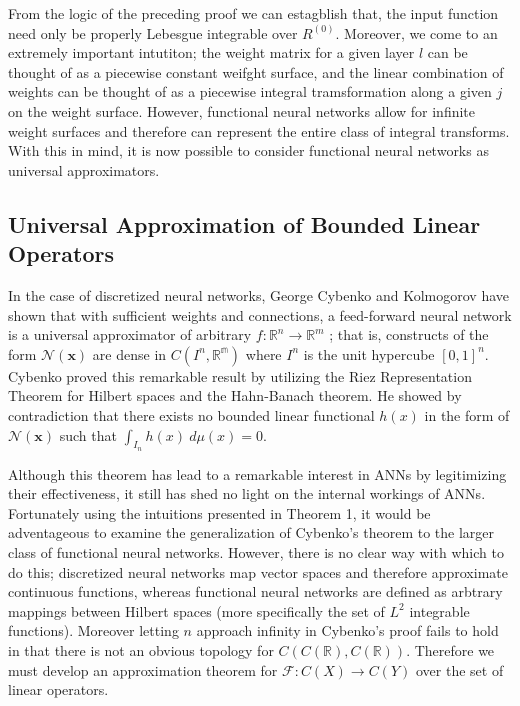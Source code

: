 \documentclass{ib-assignment}
\begin{document}
From the logic of the preceding proof we can estagblish that, the input function need only be properly Lebesgue integrable over $R^{(0)}$. Moreover, we come to an extremely important intutiton; the weight matrix for a given layer $l$ can be thought of as a piecewise constant weifght surface, and the linear combination of weights can be thought of as a piecewise integral tramsformation along a given $j$ on the weight surface. However, functional neural networks allow for infinite weight surfaces and therefore can represent the entire class of integral transforms. With this in mind, it is now possible to consider functional neural networks as universal approximators.
\subsection{Universal Approximation of Bounded Linear Operators}
In the case of discretized neural networks, George Cybenko and Kolmogorov have shown that with sufficient weights and connections, a feed-forward neural network is a universal approximator of arbitrary $f:\mathbb{R}^n \to \mathbb{R}^m$ \cite{univapprox}; that is, constructs of the form $\mathcal{N}(\pmb{x})$ are dense in $C(I^n, \mathbb{R^m})$ where $I^n$ is the unit hypercube $[0,1]^n$.  Cybenko proved this remarkable result by utilizing the Riez Representation Theorem for Hilbert spaces and the Hahn-Banach theorem. He showed by contradiction that there exists no bounded linear functional $h(x)$ in the form of $\mathcal{N}(\pmb{x})$ such that $\int_{I_n}h(x)\ d\mu(x) = 0$.

Although this theorem has lead to a remarkable interest in ANNs by legitimizing their effectiveness, it still has shed no light on the internal workings of ANNs. Fortunately using the intuitions presented in Theorem 1, it would be adventageous to examine the generalization of Cybenko's theorem to the larger class of functional neural networks. However, there is no clear way with which to do this; discretized neural networks map vector spaces and therefore approximate continuous functions, whereas functional neural networks are defined as arbtrary mappings between Hilbert spaces (more specifically the set of $L^2$ integrable functions). Moreover letting $n$ approach infinity in Cybenko's proof fails to hold in that there is not an obvious topology for $C(C(\mathbb{R}), C(\mathbb{R}))$. Therefore we must develop an approximation theorem for $\mathcal{F}: C(X) \to C(Y)$ over the set of linear operators. 
\end{document}
